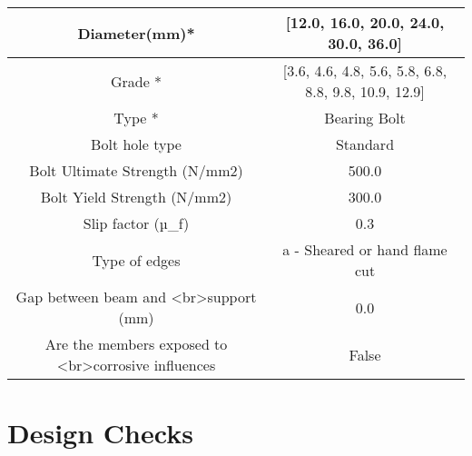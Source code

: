 \documentclass{article}%
\begin{document}
\begin{longtable}{|p{5cm}|p{2cm}|p{2cm}|p{2cm}|p{5cm}|}
\hline%
\hline%
\multicolumn{3}{|c|}{Diameter(mm)*}&\multicolumn{2}{|c|}{{[}12.0, 16.0, 20.0, 24.0, 30.0, 36.0{]}}\\%
\hline%
\hline%
\multicolumn{3}{|c|}{Grade *}&\multicolumn{2}{|c|}{{[}3.6, 4.6, 4.8, 5.6, 5.8, 6.8, 8.8, 9.8, 10.9, 12.9{]}}\\%
\hline%
\hline%
\multicolumn{3}{|c|}{Type *}&\multicolumn{2}{|c|}{Bearing Bolt}\\%
\hline%
\hline%
\multicolumn{3}{|c|}{Bolt hole type}&\multicolumn{2}{|c|}{Standard}\\%
\hline%
\hline%
\multicolumn{3}{|c|}{Bolt Ultimate Strength (N/mm2)}&\multicolumn{2}{|c|}{500.0}\\%
\hline%
\hline%
\multicolumn{3}{|c|}{Bolt Yield Strength (N/mm2)}&\multicolumn{2}{|c|}{300.0}\\%
\hline%
\hline%
\multicolumn{3}{|c|}{Slip factor (µ\_f)}&\multicolumn{2}{|c|}{0.3}\\%
\hline%
\hline%
\multicolumn{3}{|c|}{Type of edges}&\multicolumn{2}{|c|}{a {-} Sheared or hand flame cut}\\%
\hline%
\hline%
\multicolumn{3}{|c|}{Gap between beam and <br>support (mm)}&\multicolumn{2}{|c|}{0.0}\\%
\hline%
\hline%
\multicolumn{3}{|c|}{Are the members exposed to <br>corrosive influences}&\multicolumn{2}{|c|}{False}\\%
\hline%
\end{longtable}

%
%
\newpage%
\section{Design Checks}%
\label{sec:DesignChecks}%
\end{document}
